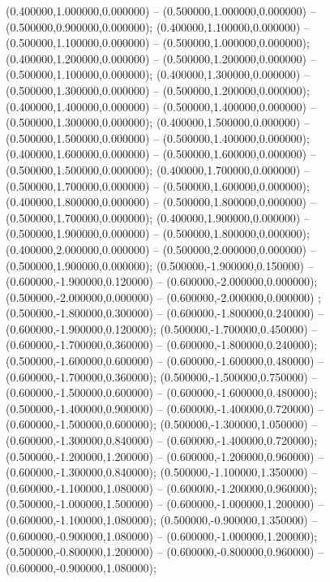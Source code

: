  (0.400000,1.000000,0.000000) -- (0.500000,1.000000,0.000000) -- (0.500000,0.900000,0.000000);
 (0.400000,1.100000,0.000000) -- (0.500000,1.100000,0.000000) -- (0.500000,1.000000,0.000000);
 (0.400000,1.200000,0.000000) -- (0.500000,1.200000,0.000000) -- (0.500000,1.100000,0.000000);
 (0.400000,1.300000,0.000000) -- (0.500000,1.300000,0.000000) -- (0.500000,1.200000,0.000000);
 (0.400000,1.400000,0.000000) -- (0.500000,1.400000,0.000000) -- (0.500000,1.300000,0.000000);
 (0.400000,1.500000,0.000000) -- (0.500000,1.500000,0.000000) -- (0.500000,1.400000,0.000000);
 (0.400000,1.600000,0.000000) -- (0.500000,1.600000,0.000000) -- (0.500000,1.500000,0.000000);
 (0.400000,1.700000,0.000000) -- (0.500000,1.700000,0.000000) -- (0.500000,1.600000,0.000000);
 (0.400000,1.800000,0.000000) -- (0.500000,1.800000,0.000000) -- (0.500000,1.700000,0.000000);
 (0.400000,1.900000,0.000000) -- (0.500000,1.900000,0.000000) -- (0.500000,1.800000,0.000000);
 (0.400000,2.000000,0.000000) -- (0.500000,2.000000,0.000000) -- (0.500000,1.900000,0.000000);
 (0.500000,-1.900000,0.150000) -- (0.600000,-1.900000,0.120000) -- (0.600000,-2.000000,0.000000);
 (0.500000,-2.000000,0.000000) -- (0.600000,-2.000000,0.000000) ;
 (0.500000,-1.800000,0.300000) -- (0.600000,-1.800000,0.240000) -- (0.600000,-1.900000,0.120000);
 (0.500000,-1.700000,0.450000) -- (0.600000,-1.700000,0.360000) -- (0.600000,-1.800000,0.240000);
 (0.500000,-1.600000,0.600000) -- (0.600000,-1.600000,0.480000) -- (0.600000,-1.700000,0.360000);
 (0.500000,-1.500000,0.750000) -- (0.600000,-1.500000,0.600000) -- (0.600000,-1.600000,0.480000);
 (0.500000,-1.400000,0.900000) -- (0.600000,-1.400000,0.720000) -- (0.600000,-1.500000,0.600000);
 (0.500000,-1.300000,1.050000) -- (0.600000,-1.300000,0.840000) -- (0.600000,-1.400000,0.720000);
 (0.500000,-1.200000,1.200000) -- (0.600000,-1.200000,0.960000) -- (0.600000,-1.300000,0.840000);
 (0.500000,-1.100000,1.350000) -- (0.600000,-1.100000,1.080000) -- (0.600000,-1.200000,0.960000);
 (0.500000,-1.000000,1.500000) -- (0.600000,-1.000000,1.200000) -- (0.600000,-1.100000,1.080000);
 (0.500000,-0.900000,1.350000) -- (0.600000,-0.900000,1.080000) -- (0.600000,-1.000000,1.200000);
 (0.500000,-0.800000,1.200000) -- (0.600000,-0.800000,0.960000) -- (0.600000,-0.900000,1.080000);
